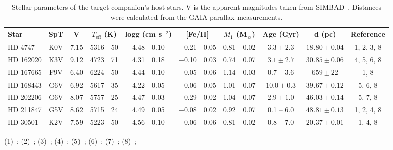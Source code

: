 
\begin{table*}
        \centering{}
        \small{}
        \caption{Stellar parameters of the target companion's host stars. V is the apparent magnitudes taken from {SIMBAD}~\citep{wenger_simbad_2000}. {\rd Distances were calculated from the GAIA parallax measurements.}}
        \begin{tabular}{l c c r@{$~\pm~$}l r@{$~\pm~$}l r@{$~\pm~$}l r@{$~\pm~$}l c c c}
            \toprule
            Star & SpT & V &  \multicolumn{2}{c}{\(T_{\textrm{eff}}\) (K)} &  \multicolumn{2}{c}{logg (cm s\(^{-2} \))}  & \multicolumn{2}{c}{[Fe/H]} &  \multicolumn{2}{c}{\(M_1\) (M\(_{\sun} \))} & Age (Gyr) & d (pc) & Reference\\
            \midrule
            {HD 4747}     & K0V & 7.15 & 5316 & 50 & 4.48 & 0.10  & $-$0.21 & 0.05 & 0.81 & 0.02  & $3.3 \pm 2.3$   & $18.80 \pm 0.04$ & 1, 2, 3, 8 \\ 
            {HD 162020} & K3V & 9.12 & 4723 & 71 & 4.31 & 0.18  & $-$0.10 & 0.03 & 0.74 & 0.07  & $3.1 \pm 2.7$   & $30.85 \pm 0.06$ & 4, 5, 6, 8 \\  
            {HD 167665} & F9V & 6.40 & 6224 & 50 & 4.44 & 0.10  & 0.05       & 0.06 & 1.14 & 0.03  & 0.7 -- 3.6           & $659 \pm 22$ & 1, 8 \\
            {HD 168443} & G6V & 6.92 & 5617 & 35 & 4.22 & 0.05 & 0.06       & 0.05 & 1.01 & 0.07  & $10.0 \pm 0.3$  & $39.67 \pm 0.12$ & 5, 6, 8 \\ 
            {HD 202206} & G6V & 8.07 & 5757 & 25 & 4.47 & 0.03 & 0.29       & 0.02 & 1.04 & 0.07  & $2.9 \pm 1.0$    & $46.03 \pm 0.14$ & 5, 7, 8 \\ 
            {HD 211847} & G5V & 8.62 & 5715 & 24 & 4.49 & 0.05 & $-$0.08 & 0.02 & 0.92 & 0.07   & 0.1 -- 6.0            & $48.81 \pm 0.13 $ & 1, 2, 4, 8 \\ 
            {HD 30501}   & K2V & 7.59  & 5223 & 50 & 4.56 & 0.10 & 0.06       & 0.06 & 0.81 & 0.02  & 0.8 -- 7.0           & $20.37 \pm 0.01$ & 1, 4, 8     \\
            \bottomrule
        \end{tabular}
        \begin{tablenotes}
           \item[] (1)~\citet{sahlmann_search_2011}; (2)~\citet{santos_spectroscopic_2005}; (3)~\citet{crepp_trends_2016}; (4)~\citet{tsantaki_deriving_2013}; (5)~\cite{bonfanti_age_2016}; (6)~\citet{santos_spectroscopic_2004}; (7)~\citet{sousa_spectroscopic_2008}; {\rd(8)~\citet{collaboration_gaia_2018}};
         \end{tablenotes}
        \label{tab:starparams}
\end{table*}